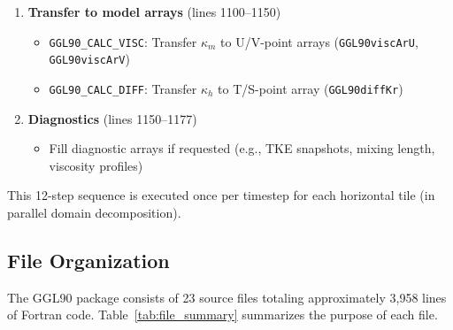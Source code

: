 \documentclass[12pt,letterpaper]{article}
\newcommand{\KM}{\kappa_m}
\newcommand{\KH}{\kappa_h}
\begin{document}
\begin{enumerate}[leftmargin=*, label=\textbf{Step \arabic*.}]
  \item \textbf{Transfer to model arrays} (lines 1100--1150)
    \begin{itemize}[label=$\circ$]
      \item \texttt{GGL90\_CALC\_VISC}: Transfer $\KM$ to U/V-point arrays
            (\texttt{GGL90viscArU}, \texttt{GGL90viscArV})
      \item \texttt{GGL90\_CALC\_DIFF}: Transfer $\KH$ to T/S-point array
            (\texttt{GGL90diffKr})
    \end{itemize}

  \item \textbf{Diagnostics} (lines 1150--1177)
    \begin{itemize}[label=$\circ$]
      \item Fill diagnostic arrays if requested (e.g., TKE snapshots, mixing
            length, viscosity profiles)
    \end{itemize}
\end{enumerate}

This 12-step sequence is executed once per timestep for each horizontal tile
(in parallel domain decomposition).

\subsection{File Organization}

The GGL90 package consists of 23 source files totaling approximately 3,958
lines of Fortran code. Table~\ref{tab:file_summary} summarizes the purpose
of each file.
\end{document}
